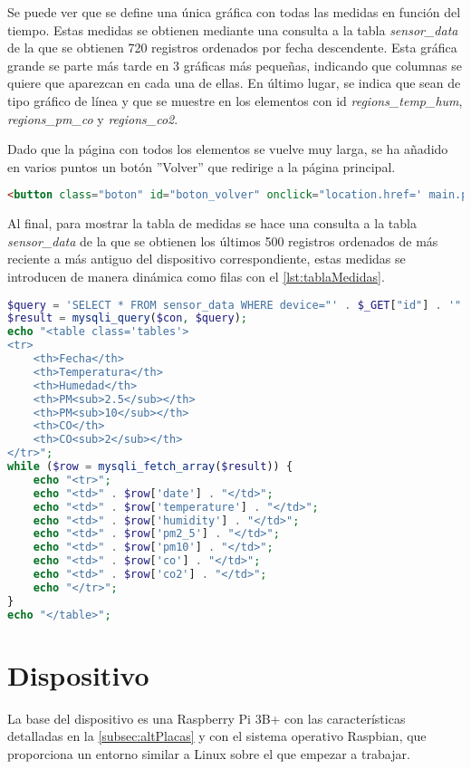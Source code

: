 Se puede ver que se define una única gráfica con todas las medidas en función del tiempo. Estas medidas se obtienen mediante una consulta a la tabla \textit{sensor\_data} de la que se obtienen 720 registros ordenados por fecha descendente. Esta gráfica grande se parte más tarde en 3 gráficas más pequeñas, indicando que columnas se quiere que aparezcan en cada una de ellas. En último lugar, se indica que sean de tipo gráfico de línea y que se muestre en los elementos con id \textit{regions\_temp\_hum}, \textit{regions\_pm\_co} y \textit{regions\_co2}.

Dado que la página con todos los elementos se vuelve muy larga, se ha añadido en varios puntos un botón ''Volver'' que redirige a la página principal.
\begin{lstlisting}[language=HTML, caption=Botón de retorno a página principal, label=lst:botonVolver]
<button class="boton" id="boton_volver" onclick="location.href=' main.php'">Volver</button>
\end{lstlisting}

Al final, para mostrar la tabla de medidas se hace una consulta a la tabla \textit{sensor\_data} de la que se obtienen los últimos 500 registros ordenados de más reciente a más antiguo del dispositivo correspondiente, estas medidas se introducen de manera dinámica como filas con el \autoref{lst:tablaMedidas}.
\begin{lstlisting}[language=PHP, caption=Visualización tabular de las medidas del dispositivo, label=lst:tablaMedidas]
$query = 'SELECT * FROM sensor_data WHERE device="' . $_GET["id"] . '" ORDER BY date DESC LIMIT 500';
$result = mysqli_query($con, $query);
echo "<table class='tables'>
<tr>
    <th>Fecha</th>
    <th>Temperatura</th>
    <th>Humedad</th>
    <th>PM<sub>2.5</sub></th>
    <th>PM<sub>10</sub></th>
    <th>CO</th>
    <th>CO<sub>2</sub></th>
</tr>";
while ($row = mysqli_fetch_array($result)) {
    echo "<tr>";
    echo "<td>" . $row['date'] . "</td>";
    echo "<td>" . $row['temperature'] . "</td>";
    echo "<td>" . $row['humidity'] . "</td>";
    echo "<td>" . $row['pm2_5'] . "</td>";
    echo "<td>" . $row['pm10'] . "</td>";
    echo "<td>" . $row['co'] . "</td>";
    echo "<td>" . $row['co2'] . "</td>";
    echo "</tr>";
}
echo "</table>";
\end{lstlisting}

\section{Dispositivo}\label{sec:implDispositivo}
La base del dispositivo es una Raspberry Pi 3B+ con las características detalladas en la \autoref{subsec:altPlacas} y con el sistema operativo Raspbian, que proporciona un entorno similar a Linux sobre el que empezar a trabajar.

